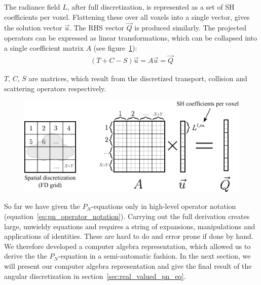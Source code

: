 The radiance field $L$, after full discretization, is represented as a set of SH coefficients per voxel. Flattening these over all voxels into a single vector, gives the solution vector $\vec{u}$. The RHS vector $\vec{Q}$ is produced similarly. The projected operators can be expressed as linear transformations, which can be collapsed into a single coefficient matrix $A$ (see figure~\ref{fig:matrix_layout}):
\begin{align}
(T+C-S)\vec{u} = A\vec{u} = \vec{Q}
\end{align}

$T$, $C$, $S$ are matrices, which result from the discretized transport, collision and scattering operators respectively.

\begin{figure}[h]
\centering
\includegraphics[width=\columnwidth]{figures/fig_matrix_layout.pdf}
\vspace{-0.2in}
\label{fig:matrix_layout}
\end{figure}

So far we have given the $P_N$-equations only in high-level operator notation (equation~\ref{eq:pn_operator_notation}). Carrying out the full derivation creates large, unwieldy equations and requires a string of expansions, manipulations and applications of identities. These are hard to do and error prone if done by hand. We therefore developed a computer algebra representation, which allowed us to derive the the $P_N$-equation in a semi-automatic fashion. In the next section, we will present our computer algebra representation and give the final result of the angular discretization in section~\ref{sec:real_valued_pn_eq}.

